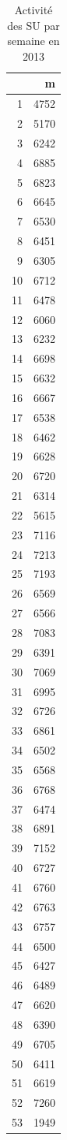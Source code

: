 \documentclass[12pt,english,french,twoside]{book}\usepackage[]{graphicx}\usepackage[]{color}
\begin{document}
\begin{table}[ht]
\centering
\begin{tabular}{rr}
  \hline
 & m \\ 
  \hline
1 & 4752 \\ 
  2 & 5170 \\ 
  3 & 6242 \\ 
  4 & 6885 \\ 
  5 & 6823 \\ 
  6 & 6645 \\ 
  7 & 6530 \\ 
  8 & 6451 \\ 
  9 & 6305 \\ 
  10 & 6712 \\ 
  11 & 6478 \\ 
  12 & 6060 \\ 
  13 & 6232 \\ 
  14 & 6698 \\ 
  15 & 6632 \\ 
  16 & 6667 \\ 
  17 & 6538 \\ 
  18 & 6462 \\ 
  19 & 6628 \\ 
  20 & 6720 \\ 
  21 & 6314 \\ 
  22 & 5615 \\ 
  23 & 7116 \\ 
  24 & 7213 \\ 
  25 & 7193 \\ 
  26 & 6569 \\ 
  27 & 6566 \\ 
  28 & 7083 \\ 
  29 & 6391 \\ 
  30 & 7069 \\ 
  31 & 6995 \\ 
  32 & 6726 \\ 
  33 & 6861 \\ 
  34 & 6502 \\ 
  35 & 6568 \\ 
  36 & 6768 \\ 
  37 & 6474 \\ 
  38 & 6891 \\ 
  39 & 7152 \\ 
  40 & 6727 \\ 
  41 & 6760 \\ 
  42 & 6763 \\ 
  43 & 6757 \\ 
  44 & 6500 \\ 
  45 & 6427 \\ 
  46 & 6489 \\ 
  47 & 6620 \\ 
  48 & 6390 \\ 
  49 & 6705 \\ 
  50 & 6411 \\ 
  51 & 6619 \\ 
  52 & 7260 \\ 
  53 & 1949 \\ 
   \hline
\end{tabular}
\caption[Activité par semaine]{Activité des SU par semaine en 2013} 
\label{act_sem}
\end{table}
\end{document}
